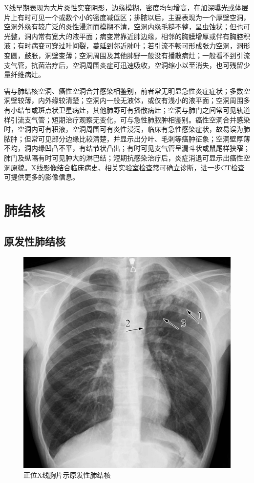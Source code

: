 X线早期表现为大片炎性实变阴影，边缘模糊，密度均匀增高，在加深曝光或体层片上有时可见一个或数个小的密度减低区；排脓以后，主要表现为一个厚壁空洞，空洞外缘有较广泛的炎性浸润而模糊不清，空洞内缘毛糙不整，呈虫蚀状；但也可光整，洞内常有宽大的液平面；病变常靠近肺边缘，相邻的胸膜增厚或伴有胸腔积液；有时病变可穿过叶间裂，蔓延到邻近肺叶；若引流不畅可形成张力空洞，洞形变圆，鼓胀，洞壁变薄；空洞周围及其他肺野一般没有播散病灶；一般看不到引流支气管，抗菌治疗后，空洞周围炎症可迅速吸收，空洞缩小以至消失，也可残留少量纤维病灶。

需与肺结核空洞、癌性空洞合并感染相鉴别，前者常无明显急性炎症症状；多数空洞壁较薄，内外缘较清楚；空洞内一般无液体，或仅有浅小的液平面；空洞周围多有小结节或斑点状卫星病灶，其他肺野可有播散病灶；空洞与肺门之间常可见轨道样引流支气管；短期治疗观察无变化，可与急性肺脓肿相鉴别。癌性空洞合并感染时，空洞内可有积液，空洞周围可有炎性浸润，临床有急性感染症状，故易误为肺脓肿；但常可见部分边缘比较清楚，并显示出分叶、毛刺等癌肿征象；空洞壁厚薄不均，洞内缘凹凸不平，有结节状凸出；有时可见支气管呈漏斗状或鼠尾样狭窄；肺门及纵隔有时可见肿大的淋巴结；短期抗感染治疗后，炎症消退可显示出癌性空洞原貌。X线影像结合临床病史、相关实验室检查常可确立诊断，进一步CT检查可提供更多的影像信息。

\section{肺结核}

\subsection{原发性肺结核}

\begin{figure}[!htbp]
 \centering
 \includegraphics{./images/Image00153.jpg}
 \captionsetup{justification=centering}
 \caption{正位X线胸片示原发性肺结核}
 \label{fig3-5-1}
  \end{figure} 

